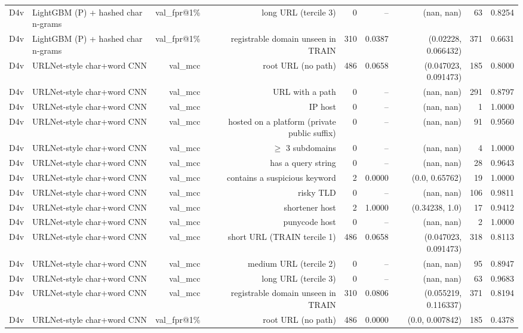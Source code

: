 \begin{table}[t]
\begin{tabular}{llrrrrrrr}
D4v & LightGBM (P) + hashed char n-grams & val\_fpr@1\% & long URL (tercile 3) & 0 & -- & (nan, nan) & 63 & 0.8254 \\
D4v & LightGBM (P) + hashed char n-grams & val\_fpr@1\% & registrable domain unseen in TRAIN & 310 & 0.0387 & (0.02228, 0.066432) & 371 & 0.6631 \\
D4v & URLNet-style char+word CNN & val\_mcc & root URL (no path) & 486 & 0.0658 & (0.047023, 0.091473) & 185 & 0.8000 \\
D4v & URLNet-style char+word CNN & val\_mcc & URL with a path & 0 & -- & (nan, nan) & 291 & 0.8797 \\
D4v & URLNet-style char+word CNN & val\_mcc & IP host & 0 & -- & (nan, nan) & 1 & 1.0000 \\
D4v & URLNet-style char+word CNN & val\_mcc & hosted on a platform (private public suffix) & 0 & -- & (nan, nan) & 91 & 0.9560 \\
D4v & URLNet-style char+word CNN & val\_mcc & $\geq$ 3 subdomains & 0 & -- & (nan, nan) & 4 & 1.0000 \\
D4v & URLNet-style char+word CNN & val\_mcc & has a query string & 0 & -- & (nan, nan) & 28 & 0.9643 \\
D4v & URLNet-style char+word CNN & val\_mcc & contains a suspicious keyword & 2 & 0.0000 & (0.0, 0.65762) & 19 & 1.0000 \\
D4v & URLNet-style char+word CNN & val\_mcc & risky TLD & 0 & -- & (nan, nan) & 106 & 0.9811 \\
D4v & URLNet-style char+word CNN & val\_mcc & shortener host & 2 & 1.0000 & (0.34238, 1.0) & 17 & 0.9412 \\
D4v & URLNet-style char+word CNN & val\_mcc & punycode host & 0 & -- & (nan, nan) & 2 & 1.0000 \\
D4v & URLNet-style char+word CNN & val\_mcc & short URL (TRAIN tercile 1) & 486 & 0.0658 & (0.047023, 0.091473) & 318 & 0.8113 \\
D4v & URLNet-style char+word CNN & val\_mcc & medium URL (tercile 2) & 0 & -- & (nan, nan) & 95 & 0.8947 \\
D4v & URLNet-style char+word CNN & val\_mcc & long URL (tercile 3) & 0 & -- & (nan, nan) & 63 & 0.9683 \\
D4v & URLNet-style char+word CNN & val\_mcc & registrable domain unseen in TRAIN & 310 & 0.0806 & (0.055219, 0.116337) & 371 & 0.8194 \\
D4v & URLNet-style char+word CNN & val\_fpr@1\% & root URL (no path) & 486 & 0.0000 & (0.0, 0.007842) & 185 & 0.4378 \\

\end{tabular}
\end{table}

